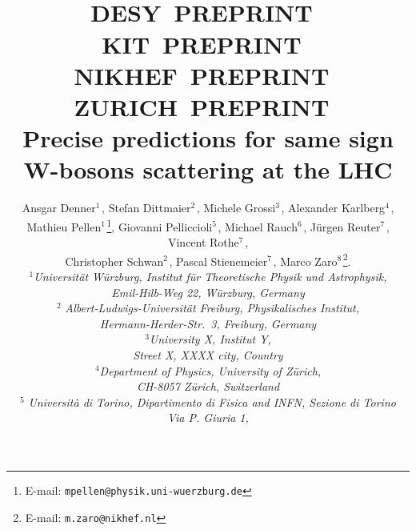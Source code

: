 \documentclass[11pt,epsf]{article}
\begin{document}
\title{\hfill ~\\[-30mm]
\phantom{h} \hfill\mbox{\small DESY PREPRINT } \\
\vspace{-10mm}
\phantom{h} \hfill\mbox{\small KIT PREPRINT } \\
\vspace{-10mm}
\phantom{h} \hfill\mbox{\small NIKHEF PREPRINT } \\
\vspace{-10mm}
\phantom{h} \hfill\mbox{\small ZURICH PREPRINT }
\\[1cm]
\textbf{Precise predictions for same sign W-bosons scattering at the LHC}}

\date{}
\author{
Ansgar Denner$^{1\,}$,
Stefan Dittmaier$^{2\,}$,
Michele Grossi$^{3\,}$,
Alexander Karlberg$^{4\,}$, \\
Mathieu Pellen$^{1\,}$\footnote{E-mail:
  \texttt{mpellen@physik.uni-wuerzburg.de}},
Giovanni  Pelliccioli$^{5\,}$,
Michael Rauch$^{6\,}$,
J\"urgen Reuter$^{7\,}$,
Vincent Rothe$^{7\,}$, \\
Christopher Schwan$^{2\,}$,
Pascal Stienemeier$^{7\,}$,
Marco Zaro$^{8\,}$\footnote{E-mail:
  \texttt{m.zaro@nikhef.nl}}.
\\[9mm]
{\small\it
$^1$Universit\"at W\"urzburg, %
        Institut f\"ur Theoretische Physik und Astrophysik,} \\ %
{\small\it Emil-Hilb-Weg 22,  W\"urzburg, %
        Germany}\\[3mm]
$^2${\small\it
Albert-Ludwigs-Universit\"at Freiburg, Physikalisches Institut,} \\ %
{\small\it Hermann-Herder-Str.\ 3,  Freiburg, Germany}\\[3mm]
{\small\it
$^3$University X, %
        Institut Y,} \\ %
{\small\it Street X, \linebreak %
        XXXX city, %
        Country}\\[3mm]
{\small\it
$^4$Department of Physics, University of Z\"urich,} \\ %
{\small\it CH-8057
Z\"urich, Switzerland}\\[3mm]
$^5${\small\it
Universit\`a di Torino, Dipartimento di Fisica and INFN, Sezione di Torino } \\ %
{\small\it Via P. Giuria 1, \linebreak %
}}
\end{document}
